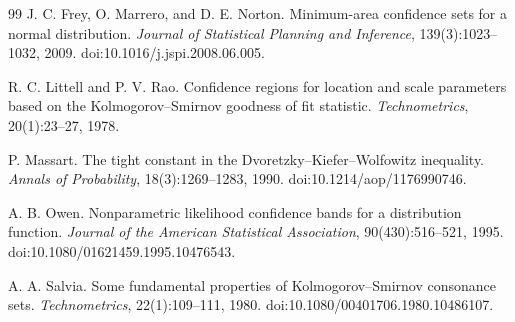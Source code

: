 \documentclass[11pt]{article}
\begin{document}
\begin{thebibliography}{99}
J. C. Frey, O. Marrero, and D. E. Norton.
Minimum-area confidence sets for a normal distribution.
\emph{Journal of Statistical Planning and Inference},
139(3):1023--1032, 2009.
doi:10.1016/j.jspi.2008.06.005.

R. C. Littell and P. V. Rao.
Confidence regions for location and scale parameters based on the
Kolmogorov--Smirnov goodness of fit statistic.
\emph{Technometrics},
20(1):23--27, 1978.

P. Massart.
The tight constant in the Dvoretzky--Kiefer--Wolfowitz inequality.
\emph{Annals of Probability},
18(3):1269--1283, 1990.
doi:10.1214/aop/1176990746.

A. B. Owen.
Nonparametric likelihood confidence bands for a distribution function.
\emph{Journal of the American Statistical Association},
90(430):516--521, 1995.
doi:10.1080/01621459.1995.10476543.

A. A. Salvia.
Some fundamental properties of Kolmogorov--Smirnov consonance sets.
\emph{Technometrics},
22(1):109--111, 1980.
doi:10.1080/00401706.1980.10486107.

\end{thebibliography}
\end{document}

